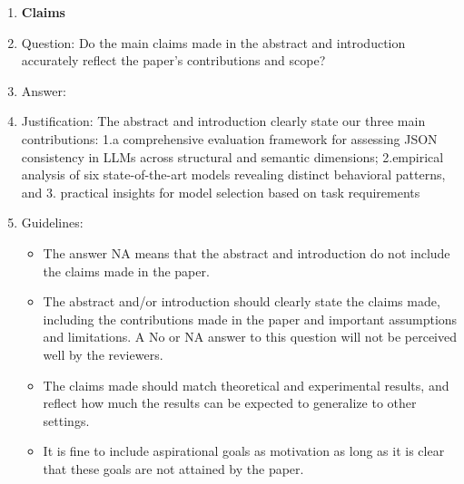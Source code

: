 \documentclass{article}
\begin{document}
\begin{enumerate}

\item {\bf Claims}
    \item[] Question: Do the main claims made in the abstract and introduction accurately reflect the paper's contributions and scope?
    \item[] Answer: \answerYes{} %
    \item[] Justification: \justification The abstract and introduction clearly state our three main contributions: 1.a comprehensive evaluation framework for assessing JSON consistency in LLMs across structural and semantic dimensions; 2.empirical analysis of six state-of-the-art models revealing distinct behavioral patterns, and 3. practical insights for model selection based on task requirements{}
    \item[] Guidelines:
    \begin{itemize}
        \item The answer NA means that the abstract and introduction do not include the claims made in the paper.
        \item The abstract and/or introduction should clearly state the claims made, including the contributions made in the paper and important assumptions and limitations. A No or NA answer to this question will not be perceived well by the reviewers. 
        \item The claims made should match theoretical and experimental results, and reflect how much the results can be expected to generalize to other settings. 
        \item It is fine to include aspirational goals as motivation as long as it is clear that these goals are not attained by the paper. 
    \end{itemize}


\end{enumerate}
\end{document}
